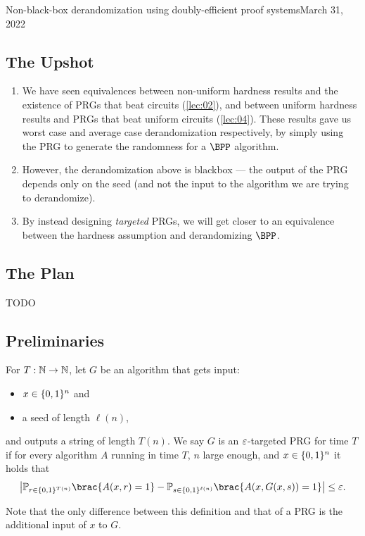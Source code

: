 
\begin{lecture}{10}{Non-black-box derandomization using doubly-efficient proof
  systems}{March 31, 2022}\label{lec:non-black-box}

\subsection*{The Upshot}

\begin{enumerate}
  \item We have seen equivalences between non-uniform hardness results and the
    existence of PRGs that beat circuits (\cref{lec:02}), and between uniform
    hardness results and PRGs that beat uniform circuits (\cref{lec:04}).
    These results gave us worst case and average case derandomization
    respectively, by simply using the PRG to generate the randomness for a
    $\BPP$ algorithm.
  \item However, the derandomization above is blackbox --- the output of the
    PRG depends only on the seed (and not the input to the algorithm we are
    trying to derandomize).
  \item By instead designing \emph{targeted} PRGs, we will get closer to an
    equivalence between the hardness assumption and derandomizing $\BPP$.
\end{enumerate}

\subsection{The Plan}
TODO

\subsection{Preliminaries}

\begin{definition}%
  \label{defn:targeted-PRG}
  For $T : \mathbb{N} \to \mathbb{N}$, let $G$ be an algorithm that gets input:
  \begin{itemize}
    \item $x \in \{0, 1\}^n$ and
    \item a seed of length $\ell(n)$,
  \end{itemize}
  and outputs a string of length $T(n)$.
  We say $G$ is an $\varepsilon$-targeted PRG for time $T$ if for every algorithm
  $A$ running in time $T$, $n$ large enough, and $x \in \{0, 1\}^n$ it holds
  that
  \[
    \card*{ \Pr_{r \in \set{0, 1}^{T(n)}} \brac{ A(x, r) = 1 } -
    \Pr_{s \in \set{0, 1}^{\ell(n)}} \brac{ A(x, G(x, s)) = 1 }} \leq \eps.
  \]
\end{definition}
Note that the only difference between this definition and that of a PRG is
the additional input of $x$ to $G$.


\end{lecture}
